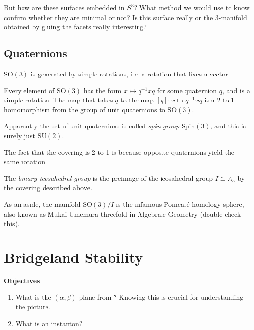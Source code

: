But how are these surfaces embedded in $S^3$? What method we would use to know
confirm whether they are minimal or not? Is this surface really or the
3-manifold obtained by gluing the facets really interesting?

\subsection{Quaternions}
\label{subsection-quaternions}

\begin{lemma}
\label{lemma-generators-SO3}
$\text{SO}(3)$ is generated by simple rotations, i.e. a rotation that fixes a
vector.
\end{lemma}

\begin{lemma}
\label{lemma-double-cover-of-SO3}
Every element of $\text{SO}(3)$ has the form $x \mapsto q^{-1}xq$ for some
quaternion $q$, and is a simple rotation. The map that takes $q$ to the map
$[q]:x \mapsto q^{-1}xq$ is a 2-to-1 homomorphism from the group of unit
quaternions to $\text{SO}(3)$.
\end{lemma}

Apparently the set of unit quaternions is called {\it spin group}
$\text{Spin}(3)$, and this is surely just $\text{SU}(2)$.

The fact that the covering is 2-to-1 is because opposite quaternions yield the
same rotation.

\begin{definition}
\label{definition-binary-icosahedral-group}
The {\it binary icosahedral group} is the preimage of the icosahedral group
$I\cong A_5$ by
the covering described above.
\end{definition}

As an aside, the manifold $\text{SO}(3)/I$ is the infamous Poincaré homology
sphere, also known as Mukai-Umemura threefold in Algebraic Geometry (double
check this).

\section{Bridgeland Stability}
\label{section-Bridgeland-stability}

{\bf Objectives}
\begin{enumerate}
\item What is the $(\alpha,\beta)$-plane from \cite{wall-crossing}? Knowing this
is crucial for understanding the picture.
\item What is an instanton?
\end{enumerate}


